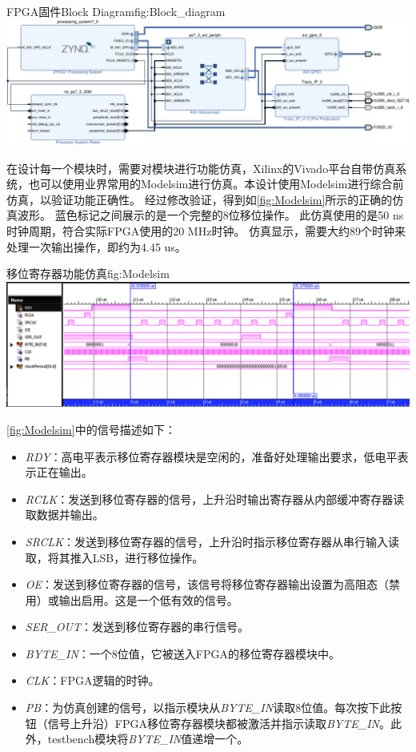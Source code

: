 \documentclass[supercite]{HustGraduPaper}
\begin{document}
\begin{generalfig}[htb]{FPGA固件Block Diagram}{fig:Block_diagram}
	\includegraphics[width=\linewidth]{Figures/Block_diagram.pdf}
\end{generalfig}

在设计每一个模块时，需要对模块进行功能仿真，Xilinx的Vivado平台自带仿真系统，也可以使用业界常用的Modelsim进行仿真。本设计使用Modelsim进行综合前仿真，以验证功能正确性。
经过修改验证，得到如\autoref{fig:Modelsim}所示的正确的仿真波形。
蓝色标记之间展示的是一个完整的8位移位操作。
此仿真使用的是50 ns时钟周期，符合实际FPGA使用的20 MHz时钟。
仿真显示，需要大约89个时钟来处理一次输出操作，即约为4.45 us。

\begin{generalfig}[htb]{移位寄存器功能仿真}{fig:Modelsim}
	\includegraphics[width=\linewidth]{Figures/Modelsim.png}
\end{generalfig}	

\autoref{fig:Modelsim}中的信号描述如下：
\begin{itemize}
	\item {\itshape RDY}：高电平表示移位寄存器模块是空闲的，准备好处理输出要求，低电平表示正在输出。
	\item {\itshape RCLK}：发送到移位寄存器的信号，上升沿时输出寄存器从内部缓冲寄存器读取数据并输出。
	\item {\itshape SRCLK}：发送到移位寄存器的信号，上升沿时指示移位寄存器从串行输入读取，将其推入LSB，进行移位操作。
	\item {\itshape OE}：发送到移位寄存器的信号，该信号将移位寄存器输出设置为高阻态（禁用）或输出启用。这是一个低有效的信号。
	\item {\itshape SER\_OUT}：发送到移位寄存器的串行信号。
	\item {\itshape BYTE\_IN}：一个8位值，它被送入FPGA的移位寄存器模块中。
	\item {\itshape CLK}：FPGA逻辑的时钟。
	\item {\itshape PB}：为仿真创建的信号，以指示模块从{\itshape BYTE\_IN}读取8位值。每次按下此按钮（信号上升沿）FPGA移位寄存器模块都被激活并指示读取{\itshape BYTE\_IN}。此外，testbench模块将{\itshape BYTE\_IN}值递增一个。
\end{itemize}
\end{document}

